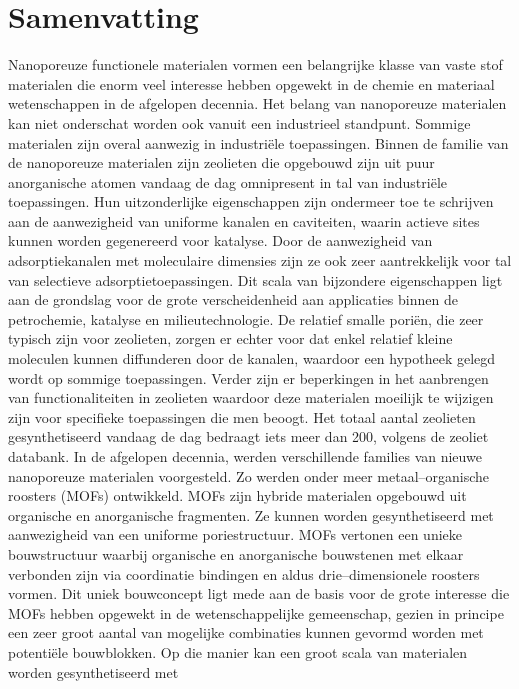 \chapter{Samenvatting}
Nanoporeuze functionele materialen vormen een belangrijke klasse van vaste stof materialen die enorm veel interesse hebben opgewekt
in de chemie en materiaal wetenschappen in de afgelopen decennia. Het belang van nanoporeuze materialen kan niet onderschat worden 
ook vanuit een industrieel standpunt. Sommige materialen zijn overal aanwezig
in industri\"ele toepassingen.
\npar
Binnen de familie van de nanoporeuze materialen zijn zeolieten die opgebouwd
zijn uit puur anorganische atomen vandaag de dag omnipresent in tal van
industri\"ele toepassingen. Hun uitzonderlijke eigenschappen zijn ondermeer toe te schrijven aan de aanwezigheid van uniforme kanalen en caviteiten, 
waarin actieve sites kunnen worden gegenereerd voor katalyse. Door de aanwezigheid 
van adsorptiekanalen met moleculaire dimensies zijn ze ook zeer aantrekkelijk voor tal 
van selectieve adsorptietoepassingen. Dit scala van bijzondere eigenschappen
ligt aan de grondslag voor de grote verscheidenheid aan applicaties binnen de petrochemie, 
katalyse en milieutechnologie. De relatief smalle pori\"en, die zeer typisch
zijn voor zeolieten, zorgen er echter voor dat enkel relatief kleine moleculen kunnen 
diffunderen door de kanalen, waardoor een hypotheek gelegd wordt op sommige toepassingen. 
Verder zijn er beperkingen in het aanbrengen van functionaliteiten in zeolieten waardoor deze 
materialen moeilijk te wijzigen zijn voor specifieke toepassingen die men beoogt. Het totaal aantal 
zeolieten gesynthetiseerd vandaag de dag bedraagt iets meer dan 200, volgens de zeoliet databank.
In de afgelopen decennia, werden verschillende families van nieuwe nanoporeuze materialen voorgesteld. 
Zo werden onder meer metaal--organische roosters (MOFs) ontwikkeld. MOFs zijn
hybride materialen opgebouwd uit organische en anorganische fragmenten. Ze
kunnen worden gesynthetiseerd met aanwezigheid van een uniforme poriestructuur. MOFs vertonen een 
unieke bouwstructuur waarbij organische en anorganische bouwstenen met elkaar verbonden zijn via 
coordinatie bindingen en aldus drie--dimensionele roosters vormen. Dit uniek
bouwconcept ligt mede aan de basis voor de grote interesse die MOFs hebben opgewekt in de 
wetenschappelijke gemeenschap, gezien in principe een zeer groot aantal van
mogelijke combinaties kunnen gevormd worden met potenti\"ele bouwblokken. 
Op die manier kan een groot scala van materialen worden gesynthetiseerd met
